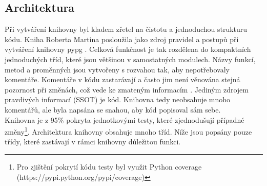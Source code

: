 \documentclass[ing,male,java,dept456]{diploma}						%
\begin{document}
\subsection{Architektura}

Při vytváření knihovny byl kladem zřetel na čistotu a jednoduchou strukturu kódu. Kniha Roberta Martina posloužila jako zdroj pravidel a postupů při vytváření knihovny pypg \cite{cleancode}. Celková funkčnost je tak rozdělena do kompaktních jednoduchých tříd, které jsou většinou v samostatných modulech. Názvy funkcí, metod a proměnných jsou vytvořeny s rozvahou tak, aby nepotřebovaly komentáře. Komentáře v kódu zastarávají a často jim není věnována stejná pozornost při změnách, což vede ke zmateným informacím  \cite{cleancode}. Jediným zdrojem pravdivých informací (SSOT) je kód. Knihovna tedy neobsahuje mnoho komentářů, ale byla napsána se snahou, aby kód popisoval sám sebe. \\
Knihovna je z 95\% pokryta jednotkovými testy, které zjednodušují případné změny\footnote{Pro zjištění pokrytí kódu testy byl využit Python coverage (https://pypi.python.org/pypi/coverage)}. Architektura knihovny obsahuje mnoho tříd. Níže jsou popsány pouze třídy, které zastávají v rámci knihovny důležitou funkci.
\end{document}
